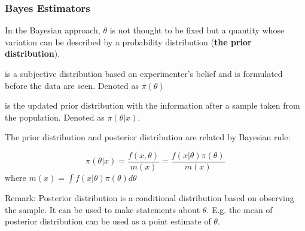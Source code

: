 \documentclass[12pt]{article}
\begin{document}
\subsubsection{Bayes Estimators}
In the Bayesian approach, $\theta$ is not thought to be fixed but a quantity whose variation can be described by a probability distribution (\textbf{the prior distribution}).

\begin{definition}
	is a subjective distribution based on experimenter's belief and is formulated before the data are seen. Denoted as $\pi(\theta)$
\end{definition}

\begin{definition} is the updated prior distribution with the information after a sample taken from the population. Denoted as $\pi(\theta | x)$.
\end{definition}

The prior distribution and posterior distribution are related by Bayesian rule:

$$
  \pi(\theta|x) = \frac{f(x, \theta)}{m(x)} =  \frac{f(x|\theta) \pi(\theta)} {m(x)} 
$$
where $m(x) = \int f(x|\theta)\pi(\theta) d\theta$

Remark: Posterior distribution is a conditional distribution based on observing the sample. It can be used to make statements about $\theta$. E.g. the mean of posterior distribution can be used as a point estimate of $\theta$.
\end{document}

